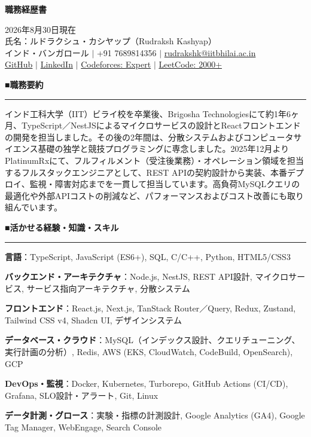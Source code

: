 \documentclass[a4paper,10pt]{ltjsarticle}
\newcommand{\jsec}[1]{%
  \par\vspace{9pt}%
  {\color{accent}\gtfamily\bfseries\large #1}\par\vspace{-5pt}%
  {\color{accent}\rule{\textwidth}{0.8pt}}\par\vspace{5pt}}
\newcommand{\skillrow}[2]{\noindent\textbf{#1}：#2\par\vspace{2pt}}
\begin{document}
\small

\begin{center}
  {\LARGE\gtfamily\bfseries 職務経歴書}
\end{center}
\vspace{-6pt}
\begin{flushright}
  2026年8月30日現在\\[2pt]
  氏名：ルドラクシュ・カシヤップ（Rudraksh Kashyap）\\[3pt]
  \small
  インド・バンガロール \;$|$\; +91 7689814356 \;$|$\;
  \href{mailto:rudrakshk@iitbhilai.ac.in}{rudrakshk@iitbhilai.ac.in}\\[1pt]
  \href{https://github.com/RudrakshKashyap}{GitHub} \;$|$\;
  \href{https://linkedin.com/in/rudrakshkashyap}{LinkedIn} \;$|$\;
  \href{https://codeforces.com/profile/rudraksh}{Codeforces: Expert} \;$|$\;
  \href{https://leetcode.com/rudraksh26}{LeetCode: 2000+}
\end{flushright}

\jsec{■\;職務要約}
インド工科大学（IIT）ビライ校を卒業後、Brigosha Technologiesにて約1年6ヶ月、TypeScript／NestJSによるマイクロサービスの設計とReactフロントエンドの開発を担当しました。その後の2年間は、分散システムおよびコンピュータサイエンス基礎の独学と競技プログラミングに専念しました。2025年12月よりPlatinumRxにて、フルフィルメント（受注後業務）・オペレーション領域を担当するフルスタックエンジニアとして、REST APIの契約設計から実装、本番デプロイ、監視・障害対応までを一貫して担当しています。高負荷MySQLクエリの最適化や外部APIコストの削減など、パフォーマンスおよびコスト改善にも取り組んでいます。

\jsec{■\;活かせる経験・知識・スキル}
\skillrow{言語}{TypeScript, JavaScript (ES6+), SQL, C/C++, Python, HTML5/CSS3}
\skillrow{バックエンド・アーキテクチャ}{Node.js, NestJS, REST API設計, マイクロサービス, サービス指向アーキテクチャ, 分散システム}
\skillrow{フロントエンド}{React.js, Next.js, TanStack Router／Query, Redux, Zustand, Tailwind CSS v4, Shadcn UI, デザインシステム}
\skillrow{データベース・クラウド}{MySQL（インデックス設計、クエリチューニング、実行計画の分析）, Redis, AWS (EKS, CloudWatch, CodeBuild, OpenSearch), GCP}
\skillrow{DevOps・監視}{Docker, Kubernetes, Turborepo, GitHub Actions (CI/CD), Grafana, SLO設計・アラート, Git, Linux}
\skillrow{データ計測・グロース}{実験・指標の計測設計, Google Analytics (GA4), Google Tag Manager, WebEngage, Search Console}
\end{document}
